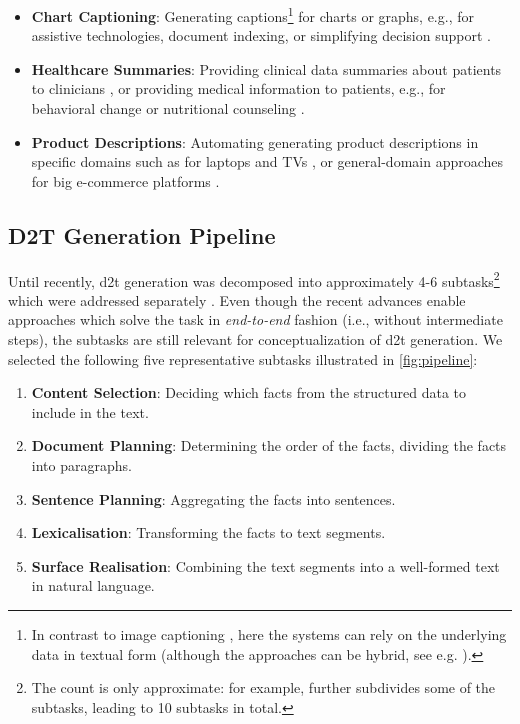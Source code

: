 {\begin{itemize}
    \item \textbf{Chart Captioning}: Generating captions\footnote{In contrast to image captioning \cite{stefanini2022show}, here the systems can rely on the underlying data in textual form (although the approaches can be hybrid, see e.g. \citealp{kantharajCharttoTextLargeScaleBenchmark2022}).} for charts or graphs, e.g., for assistive technologies, document indexing, or simplifying decision support \cite{demirGeneratingTextualSummaries2008,demirSummarizingInformationGraphics2012,obeidCharttoTextGeneratingNatural2020,kantharajCharttoTextLargeScaleBenchmark2022}.
    \item \textbf{Healthcare Summaries}: Providing clinical data summaries about patients to clinicians \cite{portet2009automatic,scott2013data}, or providing medical information to patients, e.g., for behavioral change \cite{reiter2003lessons} or nutritional counseling \cite{balloccu-reiter-2022-comparing}.
    \item \textbf{Product Descriptions}: Automating generating product descriptions in specific domains such as for laptops and TVs \cite{wen2015toward,wen2016multi}, or general-domain approaches for big e-commerce platforms \cite{shaoControllableDiverseText2021,kotoCanPretrainedLanguage2022}.
\end{itemize}

\subsection{D2T Generation Pipeline}
\label{sec:d2t-pipeline}


Until recently, \ac{d2t} generation was decomposed into approximately 4-6 subtasks\footnote{The count is only approximate: for example, \citet{milleModD2TMultilayerDataset2023} further subdivides some of the subtasks, leading to 10 subtasks in total.} which were addressed separately \cite{reiterBuildingAppliedNatural1997,reiterArchitectureDatatoTextSystems2007,gattSurveyStateArt2018}. Even though the recent advances enable approaches which solve the task in \emph{end-to-end} fashion (i.e., without intermediate steps), the subtasks are still relevant for conceptualization of \ac{d2t} generation. We selected the following five representative subtasks illustrated in \autoref{fig:pipeline}:

\begin{enumerate}
    \item \textbf{Content Selection}: Deciding which facts from the structured data
          to include in the text.
    \item \textbf{Document Planning}: Determining the order of the
          facts, dividing the facts into paragraphs.
    \item \textbf{Sentence Planning}: Aggregating the facts into
          sentences.
    \item \textbf{Lexicalisation}: Transforming the facts to text segments.
    \item \textbf{Surface Realisation}: Combining the text segments into a well-formed text in natural language.
\end{enumerate}


}
